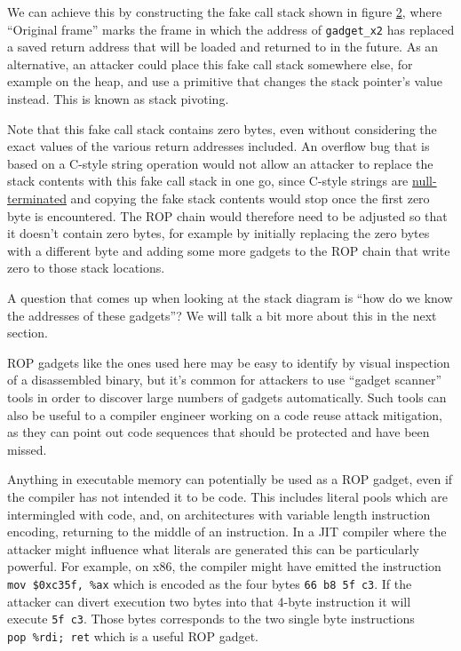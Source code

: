 \documentclass[
  a4paper,
]{report}
\begin{document}
We can achieve this by constructing the fake call stack shown in figure
\hyperref[fig:rop-call-stack]{2}, where ``Original frame'' marks the
frame in which the address of \texttt{gadget\_x2} has replaced a saved
return address that will be loaded and returned to in the future. As an
alternative, an attacker could place this fake call stack somewhere
else, for example on the heap, and use a primitive that changes the
stack pointer's value instead. This is known as
\label{__index_entry_20}{stack
pivoting}.

Note that this fake call stack contains zero bytes, even without
considering the exact values of the various return addresses included.
An overflow bug that is based on a C-style string operation would not
allow an attacker to replace the stack contents with this fake call
stack in one go, since C-style strings are
\href{https://en.wikipedia.org/wiki/Null-terminated_string}{null-terminated}
and copying the fake stack contents would stop once the first zero byte
is encountered. The ROP chain would therefore need to be adjusted so
that it doesn't contain zero bytes, for example by initially replacing
the zero bytes with a different byte and adding some more gadgets to the
ROP chain that write zero to those stack locations.

A question that comes up when looking at the stack diagram is ``how do
we know the addresses of these gadgets''? We will talk a bit more about
this in the next section.

ROP gadgets like the ones used here may be easy to identify by visual
inspection of a disassembled binary, but it's common for attackers to
use ``\label{__index_entry_21}{gadget
scanner}'' tools in order to discover large
numbers of gadgets automatically. Such tools can also be useful to a
compiler engineer working on a code reuse attack mitigation, as they can
point out code sequences that should be protected and have been missed.

Anything in executable memory can potentially be used as a ROP gadget,
even if the compiler has not intended it to be code. This includes
literal pools which are intermingled with code, and, on architectures
with variable length instruction encoding, returning to the middle of an
instruction. In a JIT compiler where the attacker might influence what
literals are generated this can be particularly powerful. For example,
on x86, the compiler might have emitted the instruction
\texttt{mov\ \$0xc35f,\ \%ax} which is encoded as the four bytes
\texttt{66\ b8\ 5f\ c3}. If the attacker can divert execution two bytes
into that 4-byte instruction it will execute \texttt{5f\ c3}. Those
bytes corresponds to the two single byte instructions
\texttt{pop\ \%rdi;\ ret} which is a useful ROP gadget.
\end{document}
